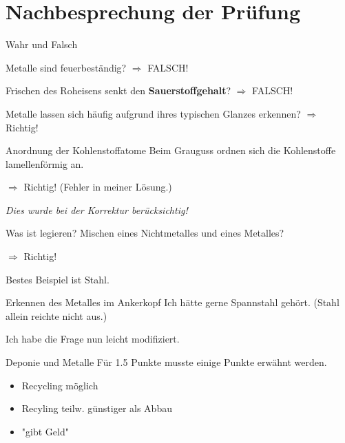 \section{Nachbesprechung der Prüfung}
\begin{frame}{Wahr und Falsch}

    Metalle sind feuerbeständig? $\Rightarrow$ FALSCH! 

    \vspace{\baselineskip} 

    Frischen des Roheisens senkt den \textbf{Sauerstoffgehalt}?
    $\Rightarrow$ FALSCH!

    \vspace{\baselineskip} 
    
    Metalle lassen sich häufig aufgrund ihres typischen Glanzes erkennen? 
    $\Rightarrow$ Richtig!
\end{frame}

\begin{frame}{Anordnung der Kohlenstoffatome}
    Beim Grauguss ordnen sich die Kohlenstoffe lamellenförmig an.

    \vspace{\baselineskip} 

    $\Rightarrow$ Richtig! (Fehler in meiner Lösung.)

    \vspace{\baselineskip} 

    \textit{Dies wurde bei der Korrektur berücksichtig!}


\end{frame}


\begin{frame}{Was ist legieren?}
    Mischen eines Nichtmetalles und eines Metalles?

    $\Rightarrow$ Richtig! 

    \textcolor{orangish}{Bestes Beispiel ist Stahl.}
\end{frame}


\begin{frame}{Erkennen des Metalles im Ankerkopf}
    \textcolor{orangish}{Ich hätte gerne Spannstahl gehört. (Stahl allein reichte nicht aus.)}

    \vspace{\baselineskip} 

    Ich habe die Frage nun leicht modifiziert.
\end{frame}


\begin{frame}{Deponie und Metalle}
    Für 1.5 Punkte musste einige Punkte erwähnt werden.

    \vspace{\baselineskip} 
    \begin{itemize}
        \item[\textbullet] Recycling möglich
        \item[\textbullet] Recyling teilw. günstiger als Abbau
        \item[\textbullet] "gibt Geld"
    \end{itemize}
\end{frame}


